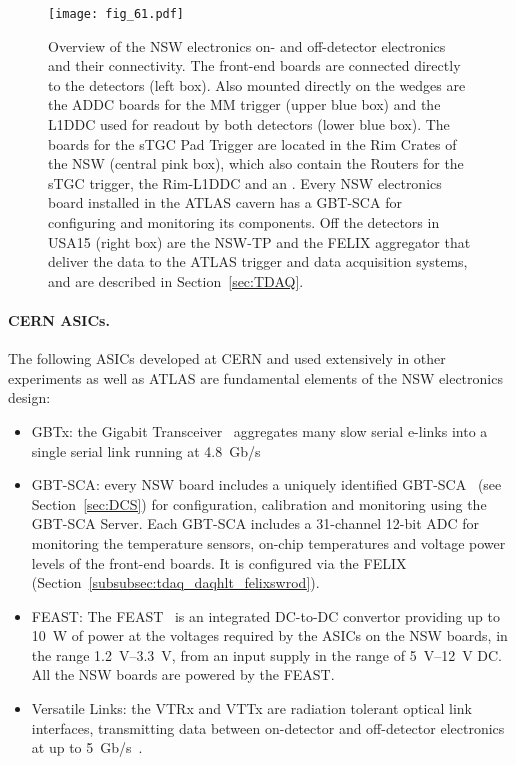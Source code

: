 \documentclass[cernpreprint, atlasdraft=false, UKenglish,british,orcidlogo, texmf, orcidlogo]{atlasdoc}
\begin{document}
\begin{figure}[!h]
\centerline{\texttt{[image: fig\_61.pdf]}}
\caption{Overview of the \gls{NSW} electronics on- and off-detector
electronics and their connectivity.
The front-end boards are connected directly to the detectors (left box).
Also mounted directly on the wedges are the \gls{ADDC} boards for the \gls{MM} trigger (upper blue box) and the \gls{L1DDC} used for readout by both detectors (lower blue box).
The boards for the \gls{sTGC} Pad Trigger are located in the Rim Crates of the \gls{NSW} (central pink box), which also contain the Routers for the \gls{sTGC} trigger, the Rim-\gls{L1DDC} and an . Every \gls{NSW} electronics board installed in the ATLAS cavern has a \gls{GBT-SCA} for configuring and monitoring its components.
Off the detectors in \gls{USA15} (right box) are
the \gls{NSW-TP} and the \gls{FELIX} aggregator that
deliver the data to the ATLAS trigger and
data acquisition systems, and are described in Section~\ref{sec:TDAQ}.}
\label{fig:Muon_NSWelectronics}
\end{figure}
 
\paragraph{CERN ASICs.}
The following \glspl{ASIC} developed at CERN and used extensively in other experiments as well as ATLAS are fundamental elements of the \gls{NSW} electronics design:
\begin{itemize}
\item \gls{GBTx}: the Gigabit Transceiver~\cite{GBTx} aggregates many slow serial \glspl{e-link} into a single serial link running at \SI{4.8}{Gb/\s}
\item \gls{GBT-SCA}: every \gls{NSW} board includes a uniquely identified \gls{GBT-SCA}~\cite{GBTSCA,GBTSCA2} (see Section~\ref{sec:DCS})
for configuration, calibration and monitoring using the \gls{GBT-SCA}  Server.
Each \gls{GBT-SCA} includes a 31-channel 12-bit \gls{ADC} for monitoring the temperature sensors, on-chip temperatures and voltage power levels of the front-end boards.
It is configured via the \gls{FELIX} (Section~\ref{subsubsec:tdaq_daqhlt_felixswrod}).
\item \gls{FEAST}: The \gls{FEAST}~\cite{FEAST} is an integrated DC-to-DC convertor providing up to \SI{10}{\watt} of power at the voltages required by the \glspl{ASIC} on the \gls{NSW} boards, in the range \SIrange{1.2}{3.3}{\volt}, from an input supply in the range of \SIrange{5}{12}{\volt} DC. All the \gls{NSW} boards are powered by the \gls{FEAST}.
\item Versatile Links: the \gls{VTRx} and \gls{VTTx} are radiation tolerant optical link interfaces, transmitting data between on-detector and off-detector electronics at up to \SI{5}{Gb/\s}~\cite{GBT}.
\end{itemize}
 
\end{document}
